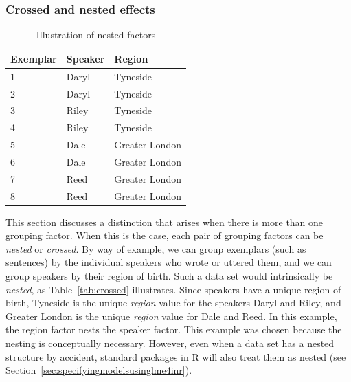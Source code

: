 \subsubsection{Crossed and nested effects}
\label{sec:crossedandnestedeffects}

\begin{table}
  \centering
  \begin{tabular}{lll}
    \toprule
    \textbf{Exemplar} & \textbf{Speaker}  & \textbf{Region}        \\
    \midrule
                    1 &           Daryl  &         Tyneside       \\
                    2 &           Daryl  &         Tyneside       \\
                    3 &           Riley  &         Tyneside       \\
                    4 &           Riley  &         Tyneside       \\
                    5 &           Dale   &         Greater London \\
                    6 &           Dale   &         Greater London \\
                    7 &           Reed   &         Greater London \\
                    8 &           Reed   &         Greater London \\
    \bottomrule
  \end{tabular}
  \caption{Illustration of nested factors}
  \label{tab:nested}
\end{table}

This section discusses a distinction that arises when there is more than one grouping factor.
When this is the case, each pair of grouping factors can be \textit{nested} or \textit{crossed}.
By way of example, we can group exemplars (such as sentences) by the individual speakers who wrote or uttered them, and we can group speakers by their region of birth.
Such a data set would intrinsically be \textit{nested}, as Table~\ref{tab:crossed} illustrates.
Since speakers have a unique region of birth, Tyneside is the unique \textit{region} value for the speakers Daryl and Riley, and Greater London is the unique \textit{region} value for Dale and Reed.
In this example, the region factor nests the speaker factor.
This example was chosen because the nesting is conceptually necessary.
However, even when a data set has a nested structure by accident, standard packages in R will also treat them as nested (see Section~\ref{sec:specifyingmodelsusinglme4inr}).

